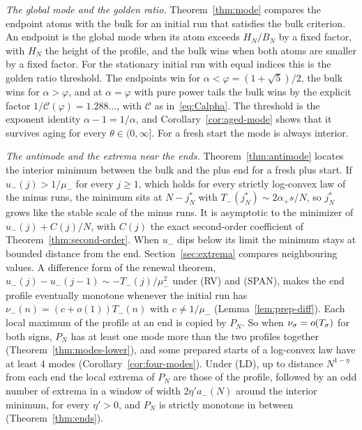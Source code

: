 \emph{The global mode and the golden ratio.} Theorem~\ref{thm:mode} compares the endpoint
atoms with the bulk for an initial run that satisfies the bulk criterion. An endpoint is
the global mode when its atom exceeds $H_N/B_N$ by a fixed factor, with $H_N$ the height of
the profile, and the bulk wins when both atoms are smaller by a fixed factor. For the
stationary initial run with equal indices this is the golden ratio threshold. The endpoints
win for $\alpha<\varphi=(1+\sqrt5)/2$, the bulk wins for $\alpha>\varphi$, and at
$\alpha=\varphi$ with pure power tails the bulk wins by the explicit factor
$1/\mathcal C(\varphi)=1.288\ldots$, with $\mathcal C$ as in~\eqref{eq:Calpha}. The threshold
is the exponent identity $\alpha-1=1/\alpha$, and Corollary~\ref{cor:aged-mode} shows that it
survives aging for every $\theta\in(0,\infty]$. For a fresh start the mode is always
interior.

\emph{The antimode and the extrema near the ends.} Theorem~\ref{thm:antimode} locates the
interior minimum between the bulk and the plus end for a fresh plus start. If
$u_\minus(j)>1/\mu_\minus$ for every $j\ge1$, which holds for every strictly log-convex law of
the minus runs, the minimum sits at $N-j^*_N$ with $T_\minus(j^*_N)\sim2\alpha_\plus s/N$, so
$j^*_N$ grows like the stable scale of the minus runs. It is asymptotic to the minimizer of
$u_\minus(j)+C(j)/N$, with $C(j)$ the exact second-order coefficient of
Theorem~\ref{thm:second-order}. When $u_\minus$ dips below its limit the minimum stays at
bounded distance from the end. Section~\ref{sec:extrema} compares neighbouring values. A
difference form of the renewal theorem,
$u_\minus(j)-u_\minus(j-1)\sim-T_\minus(j)/\mu_\minus^2$ under (RV) and (SPAN), makes the end
profile eventually monotone whenever the initial run has $\nu_\minus(n)=(c+o(1))T_\minus(n)$
with $c\ne1/\mu_\minus$ (Lemma~\ref{lem:prep-diff}). Each local maximum of the profile at an
end is copied by $P_N$. So when $\nu_\sigma=o(T_\sigma)$ for both signs, $P_N$ has at least one
mode more than the two profiles together (Theorem~\ref{thm:modes-lower}), and some prepared
starts of a log-convex law have at least 4 modes (Corollary~\ref{cor:four-modes}). Under (LD),
up to distance $N^{1-\eta}$ from each end the local extrema of $P_N$ are those of the
profile, followed by an odd number of extrema in a window of width $2\eta'a_\minus(N)$ around
the interior minimum, for every $\eta'>0$, and $P_N$ is strictly monotone in between
(Theorem~\ref{thm:ends}).

